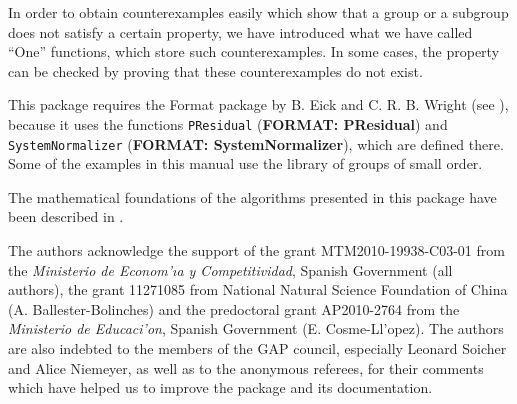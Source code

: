 \documentclass[a4paper,11pt]{report}
\begin{document}
{ In order to obtain counterexamples easily which show that a group or a
subgroup does not satisfy a certain property, we have introduced what we have
called ``One'' functions, which store such counterexamples. In some cases, the property can
be checked by proving that these counterexamples do not exist. 

 This package requires the \textsf{Format} package by B. Eick and C. R. B. Wright (see \cite{EickWright03-FORMAT}), because it uses the functions \texttt{PResidual} (\textbf{FORMAT: PResidual}) and \texttt{SystemNormalizer} (\textbf{FORMAT: SystemNormalizer}), which are defined there. Some of the examples in this manual use the library
of groups of small order. 

 The mathematical foundations of the algorithms presented in this package have
been described in \cite{BallesterCosmeEsteban13-cejm}. 

 The authors acknowledge the support of the grant MTM2010-19938-C03-01 from the \emph{Ministerio de Econom{\a'\i}a y Competitividad}, Spanish Government (all authors), the grant 11271085 from National Natural
Science Foundation of China (A. Ballester-Bolinches) and the predoctoral grant
AP2010-2764 from the \emph{Ministerio de Educaci{\a'o}n}, Spanish Government (E. Cosme-Ll{\a'o}pez). The authors are also indebted to
the members of the \textsf{GAP} council, especially Leonard Soicher and Alice Niemeyer, as well as to the
anonymous referees, for their comments which have helped us to improve the
package and its documentation. 

 }

 
\end{document}
